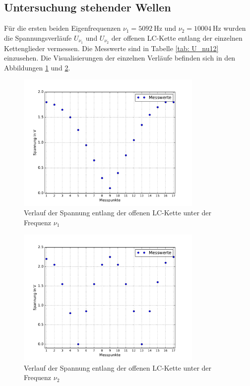 \subsection{Untersuchung stehender Wellen}
Für die ersten beiden Eigenfrequenzen $\nu_1 = \SI{5092}{\hertz}$ und $\nu_2 = \SI{10004}{\hertz}$ wurden
die Spannungsverläufe $U_{\nu_1}$ und $U_{\nu_2}$ der offenen LC-Kette entlang der einzelnen Kettenglieder vermessen. Die Messwerte sind in Tabelle
\ref{tab: U_nu12} einzusehen. Die Visualisierungen der einzelnen Verläufe befinden sich in den Abbildungen \ref{fig: U_nu1} und \ref{fig: U_nu2}.\par

\begin{figure}
  \centering
  \includegraphics[width = 0.8\textwidth]{../Messdaten/plots/spannungsverlauf_nu1.pdf}
  \caption{Verlauf der Spannung entlang der offenen LC-Kette unter der Frequenz $\nu_1$}
  \label{fig: U_nu1}
\end{figure}
\begin{figure}
  \centering
  \includegraphics[width = 0.8\textwidth]{../Messdaten/plots/spannungsverlauf_nu2.pdf}
  \caption{Verlauf der Spannung entlang der offenen LC-Kette unter der Frequenz $\nu_2$}
  \label{fig: U_nu2}
\end{figure}
